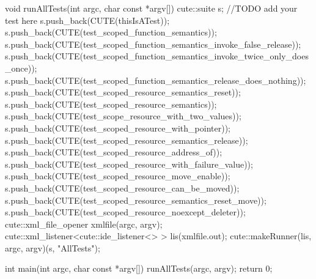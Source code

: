 \documentclass[ebook,11pt,article]{memoir}
\begin{document}
\begin{codeblock}
void runAllTests(int argc, char const *argv[]) {
	cute::suite s;
	//TODO add your test here
	s.push_back(CUTE(thisIsATest));
	s.push_back(CUTE(test_scoped_function_semantics));
	s.push_back(CUTE(test_scoped_function_semantics_invoke_false_release));
	s.push_back(CUTE(test_scoped_function_semantics_invoke_twice_only_does_once));
	s.push_back(CUTE(test_scoped_function_semantics_release_does_nothing));
	s.push_back(CUTE(test_scoped_resource_semantics_reset));
	s.push_back(CUTE(test_scoped_resource_semantics));
	s.push_back(CUTE(test_scope_resource_with_two_values));
	s.push_back(CUTE(test_scoped_resource_with_pointer));
	s.push_back(CUTE(test_scoped_resource_semantics_release));
	s.push_back(CUTE(test_scoped_resource_address_of));
	s.push_back(CUTE(test_scoped_resource_with_failure_value));
	s.push_back(CUTE(test_scoped_resource_move_enable));
	s.push_back(CUTE(test_scoped_resource_can_be_moved));
	s.push_back(CUTE(test_scoped_resource_semantics_reset_move));
	s.push_back(CUTE(test_scoped_resource_noexcept_deleter));
	cute::xml_file_opener xmlfile(argc, argv);
	cute::xml_listener<cute::ide_listener<> > lis(xmlfile.out);
	cute::makeRunner(lis, argc, argv)(s, "AllTests");
}

int main(int argc, char const *argv[]) {
	runAllTests(argc, argv);
	return 0;
}

\end{codeblock}
\end{document}
